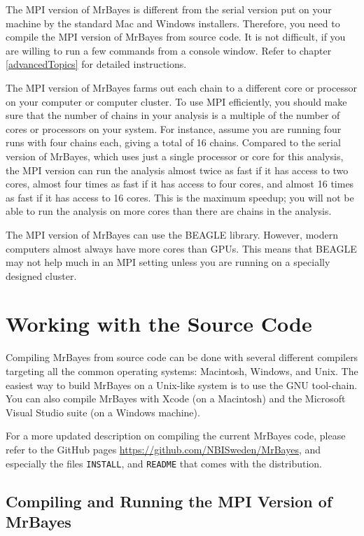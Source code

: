 \documentclass[12pt]{book}
\newcommand{\ttt}[1]{\texttt{#1}}
\begin{document}
The MPI version of MrBayes is different from the serial version put on your machine by the standard
Mac and Windows installers. Therefore, you need to compile the MPI version of MrBayes from source
code. It is not difficult, if you are willing to run a few commands from a console window. Refer to
chapter \ref{advancedTopics} for detailed instructions.

The MPI version of MrBayes farms out each chain to a different core or processor on your computer
or computer cluster. To use MPI efficiently, you should make sure that the number of chains in your
analysis is a multiple of the number of cores or processors on your system. For instance, assume
you are running four runs with four chains each, giving a total of 16 chains. Compared to the
serial version of MrBayes, which uses just a single processor or core for this analysis, the MPI
version can run the analysis almost twice as fast if it has access to two cores, almost four times
as fast if it has access to four cores, and almost 16 times as fast if it has access to 16 cores.
This is the maximum speedup; you will not be able to run the analysis on more cores than there are
chains in the analysis.

The MPI version of MrBayes can use the BEAGLE library. However, modern computers almost always have
more cores than GPUs. This means that BEAGLE may not help much in an MPI setting unless you are
running on a specially designed cluster.

\section{Working with the Source Code}

Compiling MrBayes from source code can be done with several different compilers targeting all the
common operating systems: Macintosh, Windows, and Unix. The easiest way to build MrBayes on a
Unix-like system is to use the GNU tool-chain. You can also compile MrBayes with Xcode (on a
Macintosh) and the Microsoft Visual Studio suite (on a Windows machine).

For a more updated description on compiling the current MrBayes code, please refer to the GitHub
pages \url{https://github.com/NBISweden/MrBayes}, and especially the files \ttt{INSTALL}, and
\ttt{README} that comes with the distribution.

\subsection{Compiling and Running the MPI Version of MrBayes}
\label{MPIversion}
\end{document}
